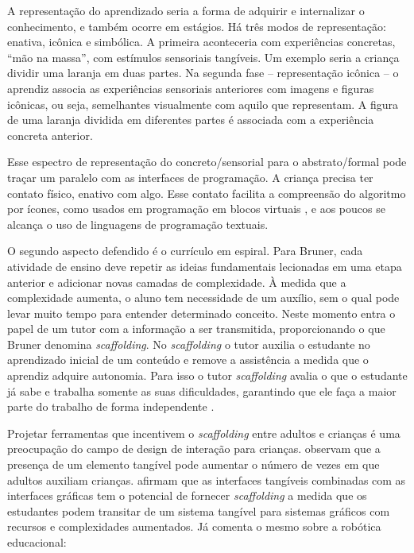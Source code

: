 A representação do aprendizado seria a forma de adquirir e internalizar o conhecimento, e também ocorre em estágios. Há três modos de representação: enativa, icônica e simbólica. A primeira aconteceria com experiências concretas, “mão na massa”, com estímulos sensoriais tangíveis. Um exemplo seria a criança dividir uma laranja em duas partes. Na segunda fase – representação icônica – o aprendiz associa as experiências sensoriais anteriores com imagens e figuras icônicas, ou seja, semelhantes visualmente com aquilo que representam. A figura de uma laranja dividida em diferentes partes é associada com a experiência concreta anterior.

Esse espectro de representação do concreto/sensorial para o abstrato/formal pode traçar um paralelo com as interfaces de programação. A criança precisa ter contato físico, enativo com algo. Esse contato facilita a compreensão do algoritmo por ícones, como usados em programação em blocos virtuais \cite{flannery_designing_2013}, e aos poucos se alcança o uso de linguagens de programação textuais.

O segundo aspecto defendido é o currículo em espiral. Para Bruner, cada atividade de ensino deve repetir as ideias fundamentais lecionadas em uma etapa anterior e adicionar novas camadas de complexidade. À medida que a complexidade aumenta, o aluno tem necessidade de um auxílio, sem o qual pode levar muito tempo para entender determinado conceito. Neste momento entra o papel de um tutor com a informação a ser transmitida, proporcionando o que Bruner denomina \textit{scaffolding}. No \textit{scaffolding} o tutor auxilia o estudante no aprendizado inicial de um conteúdo \cite{valkenburg_joining_2010} e remove a assistência a medida que o aprendiz adquire autonomia. Para isso o tutor \textit{scaffolding} avalia o que o estudante já sabe e trabalha somente as suas dificuldades, garantindo que ele faça a maior parte do trabalho de forma independente \cite{valkenburg_joining_2010}.

Projetar ferramentas que incentivem o \textit{scaffolding} entre adultos e crianças é uma preocupação do campo de design de interação para crianças.  observam que a presença de um elemento tangível pode aumentar o número de vezes em que adultos auxiliam crianças.  afirmam que as interfaces tangíveis combinadas com as interfaces gráficas tem o potencial de fornecer \textit{scaffolding} a medida que os estudantes podem transitar de um sistema tangível para sistemas gráficos com recursos e complexidades aumentados. Já  comenta o mesmo sobre a robótica educacional:

